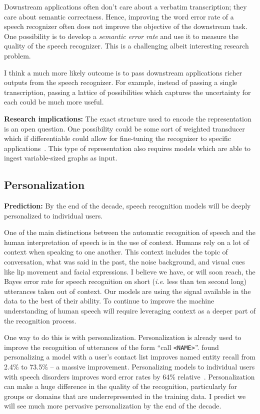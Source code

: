 Downstream applications often don't care about a verbatim transcription; they
care about semantic correctness. Hence, improving the word error rate of a
speech recognizer often does not improve the objective of the downstream task.
One possibility is to develop a \emph{semantic error rate} and use
it to measure the quality of the speech recognizer. This is a challenging
albeit interesting research problem.

I think a much more likely outcome is to pass downstream applications richer
outputs from the speech recognizer. For example, instead of passing a single
transcription, passing a lattice of possibilities which captures the
uncertainty for each could be much more useful.

{\bf Research implications:} The exact structure used to encode the
representation is an open question. One possibility could be some sort of
weighted transducer which if differentiable could allow for fine-tuning the
recognizer to specific applications~\cite{k2, hannun2020differentiable}. This
type of representation also requires models which are able to ingest
variable-sized graphs as input.

\subsection{Personalization}

{\bf Prediction:} By the end of the decade, speech recognition models will be
deeply personalized to individual users.

One of the main distinctions between the automatic recognition of speech and
the human interpretation of speech is in the use of context. Humans rely on a
lot of context when speaking to one another. This context includes the topic
of conversation, what was said in the past, the noise background, and visual
cues like lip movement and facial expressions. I believe we have, or will soon
reach, the Bayes error rate for speech recognition on short (\emph{i.e.} less
than ten second long) utterances taken out of context. Our models are using the
signal available in the data to the best of their ability.  To continue to
improve the machine understanding of human speech will require leveraging
context as a deeper part of the recognition process.

One way to do this is with personalization. Personalization is already used to
improve the recognition of utterances of the form ``call \texttt{<NAME>}''.
\citet{sim2019personalization} found personalizing a model with a user's
contact list improves named entity recall from 2.4\% to 73.5\% -- a massive
improvement. Personalizing models to individual users with speech disorders
improves word error rates by 64\% relative~\citep{sim2019investigation}.
Personalization can make a huge difference in the quality of the
recognition, particularly for groups or domains that are underrepresented in
the training data. I predict we will see much more pervasive personalization by
the end of the decade.

